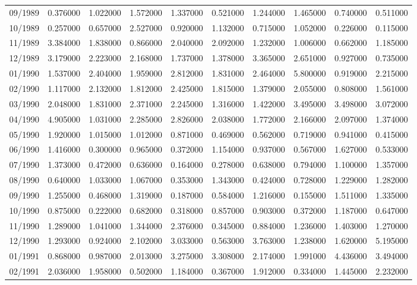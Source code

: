\begin{tabular}{lrrrrrrrrr}
09/1989 & 0.376000 & 1.022000 & 1.572000 & 1.337000 & 0.521000 & 1.244000 & 1.465000 & 0.740000 & 0.511000 \\
10/1989 & 0.257000 & 0.657000 & 2.527000 & 0.920000 & 1.132000 & 0.715000 & 1.052000 & 0.226000 & 0.115000 \\
11/1989 & 3.384000 & 1.838000 & 0.866000 & 2.040000 & 2.092000 & 1.232000 & 1.006000 & 0.662000 & 1.185000 \\
12/1989 & 3.179000 & 2.223000 & 2.168000 & 1.737000 & 1.378000 & 3.365000 & 2.651000 & 0.927000 & 0.735000 \\
01/1990 & 1.537000 & 2.404000 & 1.959000 & 2.812000 & 1.831000 & 2.464000 & 5.800000 & 0.919000 & 2.215000 \\
02/1990 & 1.117000 & 2.132000 & 1.812000 & 2.425000 & 1.815000 & 1.379000 & 2.055000 & 0.808000 & 1.561000 \\
03/1990 & 2.048000 & 1.831000 & 2.371000 & 2.245000 & 1.316000 & 1.422000 & 3.495000 & 3.498000 & 3.072000 \\
04/1990 & 4.905000 & 1.031000 & 2.285000 & 2.826000 & 2.038000 & 1.772000 & 2.166000 & 2.097000 & 1.374000 \\
05/1990 & 1.920000 & 1.015000 & 1.012000 & 0.871000 & 0.469000 & 0.562000 & 0.719000 & 0.941000 & 0.415000 \\
06/1990 & 1.416000 & 0.300000 & 0.965000 & 0.372000 & 1.154000 & 0.937000 & 0.567000 & 1.627000 & 0.533000 \\
07/1990 & 1.373000 & 0.472000 & 0.636000 & 0.164000 & 0.278000 & 0.638000 & 0.794000 & 1.100000 & 1.357000 \\
08/1990 & 0.640000 & 1.033000 & 1.067000 & 0.353000 & 1.343000 & 0.424000 & 0.728000 & 1.229000 & 1.282000 \\
09/1990 & 1.255000 & 0.468000 & 1.319000 & 0.187000 & 0.584000 & 1.216000 & 0.155000 & 1.511000 & 1.335000 \\
10/1990 & 0.875000 & 0.222000 & 0.682000 & 0.318000 & 0.857000 & 0.903000 & 0.372000 & 1.187000 & 0.647000 \\
11/1990 & 1.289000 & 1.041000 & 1.344000 & 2.376000 & 0.345000 & 0.884000 & 1.236000 & 1.403000 & 1.270000 \\
12/1990 & 1.293000 & 0.924000 & 2.102000 & 3.033000 & 0.563000 & 3.763000 & 1.238000 & 1.620000 & 5.195000 \\
01/1991 & 0.868000 & 0.987000 & 2.013000 & 3.275000 & 3.308000 & 2.174000 & 1.991000 & 4.436000 & 3.494000 \\
02/1991 & 2.036000 & 1.958000 & 0.502000 & 1.184000 & 0.367000 & 1.912000 & 0.334000 & 1.445000 & 2.232000 \\

\end{tabular}
